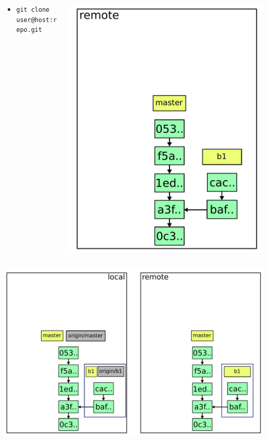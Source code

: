 \documentclass{beamer}
\begin{document}
\begin{frame}{}
  \begin{columns}
    \begin{column}{0.60\textwidth}
      \begin{itemize}
      \item \lstinline|git clone user@host:repo.git|
      \end{itemize}
    \end{column}
    \begin{column}{0.40\textwidth}
      \includegraphics[width=\textwidth]{img/1.pdf}
    \end{column}
  \end{columns}
\end{frame}

\begin{frame}{}
  \includegraphics[width=\textwidth]{img/2.pdf}
\end{frame}
\end{document}
